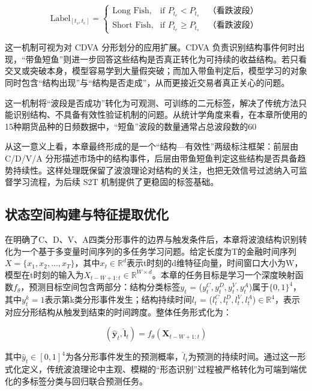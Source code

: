 \begin{equation}
\text{Label}_{[t_s, t_e]} =
\begin{cases}
\text{Long Fish}, & \text{if } P_{t_e} < P_{t_s} \quad \text{（看跌波段）} \\
\text{Short Fish}, & \text{if } P_{t_e} \geq P_{t_s} \quad \text{（看跌波段）}
\end{cases}
\end{equation}

这一机制可视为对 CDVA 分形划分的应用扩展。CDVA 负责识别结构事件何时出现，``带鱼短鱼''则进一步回答这些结构是否真正转化为可持续的收益结构。若只看交叉或突破本身，模型容易学到大量假突破；而加入带鱼判定后，模型学习的对象同时包含“结构出现”与“结构是否走成”，从而更接近交易者真正关心的问题。

这一机制将``波段是否成功''转化为可观测、可训练的二元标签，解决了传统方法只能识别结构、不具备有效性验证机制的问题。从统计学角度来看，在本章所使用的15种期货品种的日频数据中，``短鱼''波段的数量通常占总波段数的60%

从这一意义上看，本章最终形成的是一个“结构—有效性”两级标注框架：前层由 C/D/V/A 分形描述市场中的结构事件，后层由带鱼短鱼判定这些结构是否具备趋势持续性。这样处理既保留了波浪理论对结构的关注，也把无效信号过滤纳入可监督学习流程，为后续 S2T 机制提供了更稳固的标签基础。

\subsection{状态空间构建与特征提取优化}

在明确了C、D、V、A四类分形事件的边界与触发条件后，本章将波浪结构识别转化为一个基于多变量时间序列的多任务学习问题。给定长度为T的金融时间序列$X = \{x_1, x_2, \dots, x_T\}$，其中$x_t \in \mathbb{R}^d$表示t时刻的d维特征向量，时间窗口大小为W，模型在t时刻的输入为$X_{t-W+1:t} \in \mathbb{R}^{W \times d}$。本章的任务目标是学习一个深度映射函数$f_\theta$，预测目标空间包含两部分：结构分类标签$y_t$ = ($y^C_t, y^D_t, y^V_t, y^A_t$)属于$\{0, 1\}^4$，其中$y^k_t = 1$表示第k类分形事件发生；结构持续时间$l_t$ = ($l^C_t, l^D_t, l^V_t, l^A_t$)$\in \mathbb{R}^4$，表示对应分形结构从触发到结束的时间跨度。整体任务形式化为：

\begin{equation}
    (\hat{\mathbf{y}}_t, \hat{\mathbf{l}}_t) = f_\theta(\mathbf{X}_{t-W+1:t})
\end{equation}

其中$\hat{y}_t \in [0, 1]^4$为各分形事件发生的预测概率，$\hat{l}_t$为预测的持续时间。通过这一形式化定义，传统波浪理论中主观、模糊的``形态识别''过程被严格转化为可端到端优化的多标签分类与回归联合预测任务。

